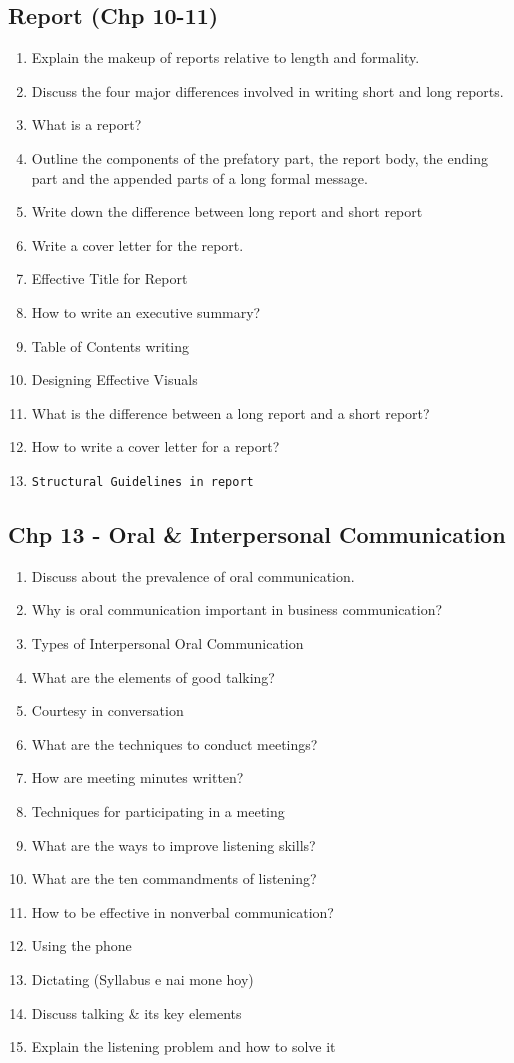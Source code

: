 \documentclass[11pt]{article}
\begin{document}
\subsection{Report (Chp 10-11)}
\label{sec:org8f6cc6e}
\begin{enumerate}
\item Explain the makeup of reports relative to length and formality.
\item Discuss the four major differences involved in writing short and long reports.
\item What is a report?
\item Outline the components of the prefatory part, the report body, the ending part and the appended parts of a long formal message.
\item Write down the difference between long report and short report
\item Write a cover letter for the report.
\item Effective Title for Report
\item How to write an executive summary?
\item Table of Contents writing
\item Designing Effective Visuals
\item What is the difference between a long report and a short report?
\item How to write a cover letter for a report?
\item \texttt{Structural Guidelines in report}
\end{enumerate}

\subsection{Chp 13 - Oral \& Interpersonal Communication}
\label{sec:orga19f46f}

\begin{enumerate}
\item Discuss about the prevalence of oral communication.
\item Why is oral communication important in business communication?
\item Types of Interpersonal Oral Communication
\item What are the elements of good talking?
\item Courtesy in conversation
\item What are the techniques to conduct meetings?
\item How are meeting minutes written?
\item Techniques for participating in a meeting
\item What are the ways to improve listening skills?
\item What are the ten commandments of listening?
\item How to be effective in nonverbal communication?
\item Using the phone
\item Dictating (Syllabus e nai mone hoy)
\item Discuss talking \& its key elements
\item Explain the listening problem and how to solve it
\end{enumerate}
\end{document}
